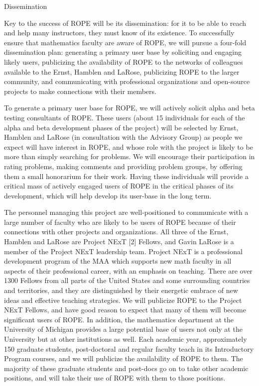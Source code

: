 \documentclass[11pt]{article}
\begin{document}
\begin{section}{Dissemination}

Key to the success of ROPE will be its dissemination: for it to be able
to reach and help many instructors, they must know of its existence.  To
successfully ensure that mathematics faculty are aware of ROPE, we will
pursue a four-fold dissemination plan: generating a primary user base by
soliciting and engaging likely users, publicizing the availability of ROPE to the networks of colleagues available to the Ernst, Hamblen and
LaRose, publicizing ROPE to the larger community, and communicating
with professional organizations and open-source projects to make
connections with their members.

To generate a primary user base for ROPE, we will actively solicit
alpha and beta testing consultants of ROPE.  These users (about 15
individuals for each of the alpha and beta development phases of the
project) will be selected by Ernst, Hamblen and LaRose (in consultation
with the Advisory Group) as people we expect will have interest in ROPE, and whose role with the project is likely to be more than simply
searching for problems.  We will encourage their participation in rating
problems, making comments and providing problem groups, by offering them a
small honorarium for their work.  Having these individuals will provide a
critical mass of actively engaged users of ROPE in the critical phases
of its development, which will help develop its user-base in the long
term.

The personnel managing this project are well-positioned to communicate
with a large number of faculty who are likely to be users of ROPE
because of their connections with other projects and organizations.  All
three of the Ernst, Hamblen and LaRose are Project NExT [2]
Fellows, and Gavin LaRose is a member of the Project NExT leadership team.
Project NExT is a professional development program of the MAA which
supports new math faculty in all aspects of their professional career,
with an emphasis on teaching.  There are over 1300 Fellows from all parts
of the United States and some surrounding countries and territories, and
they are distinguished by their energetic embrace of new ideas and
effective teaching strategies.  We will publicize ROPE to the Project
NExT Fellows, and have good reason to expect that many of them will become
significant users of ROPE.  In addition, the mathematics department at
the University of Michigan provides a large potential base of users not
only at the University but at other institutions as well.  Each academic
year, approximately 150 graduate students, post-doctoral and regular
faculty teach in its Introductory Program courses, and we will publicize
the availability of ROPE to them.  The majority of these graduate
students and post-docs go on to take other academic positions, and will
take their use of ROPE with them to those positions.


\end{section}
\end{document}

